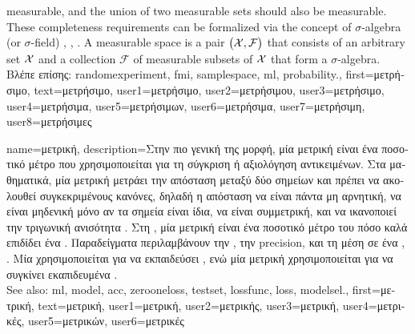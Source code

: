 {{		measurable, and the union of two measurable sets should also be measurable. These completeness 
		requirements can be formalized via the concept of $\sigma$-algebra (or $\sigma$-field) 
		\cite{RudinBook}, \cite{BillingsleyProbMeasure}, \cite{durrett2010probability}. 
		A measurable space is a pair $\big(\mathcal{X},\mathcal{F}\big)$ that consists of an arbitrary set $\mathcal{X}$ and a 
		collection $\mathcal{F}$ of measurable subsets of $\mathcal{X}$ that form a $\sigma$-algebra. \\
		\foreignlanguage{greek}{Βλέπε επίσης:} \gls{randomexperiment}, \gls{fmi}, \gls{samplespace}, \gls{ml}, \gls{probability}.},
	first={\foreignlanguage{greek}{μετρήσιμο}},
	text={\foreignlanguage{greek}{μετρήσιμο}},
	user1={\foreignlanguage{greek}{μετρήσιμο}}, %
  	user2={\foreignlanguage{greek}{μετρήσιμου}}, %
	user3={\foreignlanguage{greek}{μετρήσιμο}}, %
	user4={\foreignlanguage{greek}{μετρήσιμα}}, %
  	user5={\foreignlanguage{greek}{μετρήσιμων}}, %
	user6={\foreignlanguage{greek}{μετρήσιμα}}, %
	user7={\foreignlanguage{greek}{μετρήσιμη}}, %
	user8={\foreignlanguage{greek}{μετρήσιμες}} %
}

{name={\foreignlanguage{greek}{μετρική}},
	description={\foreignlanguage{greek}{Στην πιο γενική της μορφή, μία μετρική} 
		\foreignlanguage{greek}{είναι ένα ποσοτικό μέτρο που χρησιμοποιείται για τη σύγκριση ή αξιολόγηση αντικειμένων.  
		Στα μαθηματικά, μία μετρική μετράει την απόσταση μεταξύ δύο σημείων και πρέπει να ακολουθεί συγκεκριμένους 
		κανόνες, δηλαδή η απόσταση να είναι πάντα μη αρνητική, να είναι μηδενική μόνο αν τα σημεία είναι ίδια, να είναι 
		συμμετρική, και να ικανοποιεί την τριγωνική ανισότητα} \cite{RudinBookPrinciplesMatheAnalysis}. 
		\foreignlanguage{greek}{Στη} , \foreignlanguage{greek}{μία μετρική είναι ένα ποσοτικό μέτρο  
		του πόσο καλά επιδίδει ένα} . \foreignlanguage{greek}{Παραδείγματα περιλαμβάνουν την} 
		, \foreignlanguage{greek}{την} precision, \foreignlanguage{greek}{και τη μέση}  
		\foreignlanguage{greek}{σε ένα}  \cite{Goodfellow-et-al-2016}, \cite{BishopBook}. 
		\foreignlanguage{greek}{Μία}  \foreignlanguage{greek}{χρησιμοποιείται για να εκπαιδεύσει} , 
		\foreignlanguage{greek}{ενώ μία μετρική χρησιμοποιείται για να συγκίνει εκαπιδευμένα} . 
		\\ See also: \gls{ml}, \gls{model}, \gls{acc}, \gls{zerooneloss}, \gls{testset}, \gls{lossfunc}, \gls{loss}, \gls{modelsel}.},
	first={\foreignlanguage{greek}{μετρική}}, 
	text={\foreignlanguage{greek}{μετρική}},
	user1={\foreignlanguage{greek}{μετρική}}, %
	user2={\foreignlanguage{greek}{μετρικής}}, %
	user3={\foreignlanguage{greek}{μετρική}}, %
	user4={\foreignlanguage{greek}{μετρικές}}, %
	user5={\foreignlanguage{greek}{μετρικών}}, %
	user6={\foreignlanguage{greek}{μετρικές}} %
}

